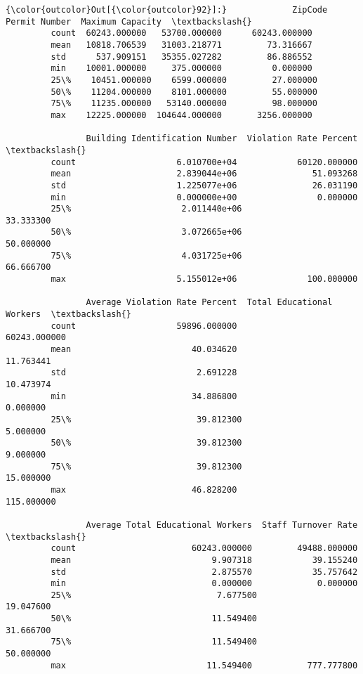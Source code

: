 \documentclass[11pt]{article}
\begin{document}
\begin{Verbatim}[commandchars=\\\{\}]
{\color{outcolor}Out[{\color{outcolor}92}]:}             ZipCode  Permit Number  Maximum Capacity  \textbackslash{}
         count  60243.000000   53700.000000      60243.000000   
         mean   10818.706539   31003.218771         73.316667   
         std      537.909151   35355.027282         86.886552   
         min    10001.000000     375.000000          0.000000   
         25\%    10451.000000    6599.000000         27.000000   
         50\%    11204.000000    8101.000000         55.000000   
         75\%    11235.000000   53140.000000         98.000000   
         max    12225.000000  104644.000000       3256.000000   
         
                Building Identification Number  Violation Rate Percent  \textbackslash{}
         count                    6.010700e+04            60120.000000   
         mean                     2.839044e+06               51.093268   
         std                      1.225077e+06               26.031190   
         min                      0.000000e+00                0.000000   
         25\%                      2.011440e+06               33.333300   
         50\%                      3.072665e+06               50.000000   
         75\%                      4.031725e+06               66.666700   
         max                      5.155012e+06              100.000000   
         
                Average Violation Rate Percent  Total Educational Workers  \textbackslash{}
         count                    59896.000000               60243.000000   
         mean                        40.034620                  11.763441   
         std                          2.691228                  10.473974   
         min                         34.886800                   0.000000   
         25\%                         39.812300                   5.000000   
         50\%                         39.812300                   9.000000   
         75\%                         39.812300                  15.000000   
         max                         46.828200                 115.000000   
         
                Average Total Educational Workers  Staff Turnover Rate  \textbackslash{}
         count                       60243.000000         49488.000000   
         mean                            9.907318            39.155240   
         std                             2.875570            35.757642   
         min                             0.000000             0.000000   
         25\%                             7.677500            19.047600   
         50\%                            11.549400            31.666700   
         75\%                            11.549400            50.000000   
         max                            11.549400           777.777800   
         

\end{Verbatim}
\end{document}
